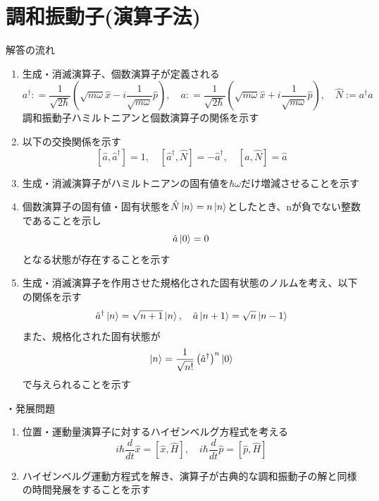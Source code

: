 \documentclass{jsarticle}  %
\numberwithin{equation}{section} %
\numberwithin{figure}{section}
\begin{document}
\section{調和振動子(演算子法)}
    \begin{itembox}[l]{\large{解答の流れ}}
        \begin{enumerate}
            \item 生成・消滅演算子、個数演算子が定義される
            \[ a^\dagger : = \frac{1}{\sqrt{2\hbar}}\left( \sqrt{m\omega} \hat{x} -i \frac{1}{\sqrt{m\omega}} \hat{p}\right) ,\quad a : = \frac{1}{\sqrt{2\hbar}}\left( \sqrt{m\omega} \hat{x} +i \frac{1}{\sqrt{m\omega}} \hat{p}\right),\quad \hat{N} := a^\dagger a  \]
            調和振動子ハミルトニアンと個数演算子の関係を示す
            \item 以下の交換関係を示す
            \[ [\hat{a},\hat{a}^\dagger] = 1,\quad [\hat{a}^\dagger,\hat{N}]=-\hat{a}^\dagger,\quad [\hat{a},\hat{N}]=\hat{a} \]
            \item 生成・消滅演算子がハミルトニアンの固有値を$\hbar \omega$だけ増減させることを示す
            \item 個数演算子の固有値・固有状態を$\hat{N}\ket{n} = n\ket{n}$としたとき、nが負でない整数であることを示し
            \[ \hat{a}\ket{0} = 0 \]
            となる状態が存在することを示す
            \item 生成・消滅演算子を作用させた規格化された固有状態のノルムを考え、以下の関係を示す
            \[ \hat{a}^\dagger \ket{n} = \sqrt{n+1}\ket{n},\quad \hat{a}\ket{n+1} = \sqrt{n}\ket{n-1} \]
            また、規格化された固有状態が
            \[ \ket{n} = \frac{1}{\sqrt{n!}} \left(\hat{a}^\dagger\right)^n \ket{0} \]
            で与えられることを示す
        \end{enumerate}
        ・発展問題
        \begin{enumerate}
            \item 位置・運動量演算子に対するハイゼンベルグ方程式を考える
            \[ i\hbar \frac{d}{dt} \hat{x} = [\hat{x},\hat{H}] ,\quad i\hbar \frac{d}{dt} \hat{p} = [\hat{p},\hat{H}]\]
            \item ハイゼンベルグ運動方程式を解き、演算子が古典的な調和振動子の解と同様の時間発展をすることを示す
        \end{enumerate}
    \end{itembox}
\end{document}
